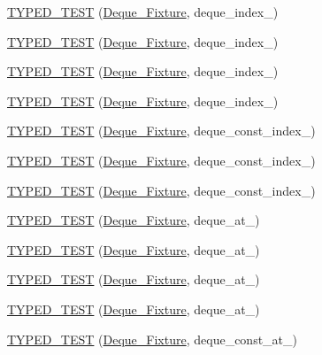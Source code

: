 \begin{DoxyCompactItemize}
\item 
\hyperlink{TestDeque_8c_09_09_a25f99a244d6b38026a8c7c3833c35976}{T\-Y\-P\-E\-D\-\_\-\-T\-E\-S\-T} (\hyperlink{structDeque__Fixture}{Deque\-\_\-\-Fixture}, deque\-\_\-index\-\_)
\item 
\hyperlink{TestDeque_8c_09_09_a37b19408f913732ec3441a3b4f3298c9}{T\-Y\-P\-E\-D\-\_\-\-T\-E\-S\-T} (\hyperlink{structDeque__Fixture}{Deque\-\_\-\-Fixture}, deque\-\_\-index\-\_)
\item 
\hyperlink{TestDeque_8c_09_09_a7a9cd30acbc9043ace80349348e8ff1e}{T\-Y\-P\-E\-D\-\_\-\-T\-E\-S\-T} (\hyperlink{structDeque__Fixture}{Deque\-\_\-\-Fixture}, deque\-\_\-index\-\_)
\item 
\hyperlink{TestDeque_8c_09_09_a9c533dd589fc834353048b53831c4b5d}{T\-Y\-P\-E\-D\-\_\-\-T\-E\-S\-T} (\hyperlink{structDeque__Fixture}{Deque\-\_\-\-Fixture}, deque\-\_\-index\-\_)
\item 
\hyperlink{TestDeque_8c_09_09_a9ac51be2c184c7125f8b3ab2807a4da7}{T\-Y\-P\-E\-D\-\_\-\-T\-E\-S\-T} (\hyperlink{structDeque__Fixture}{Deque\-\_\-\-Fixture}, deque\-\_\-const\-\_\-index\-\_)
\item 
\hyperlink{TestDeque_8c_09_09_a20578415bd1661d34e29d476369b3e99}{T\-Y\-P\-E\-D\-\_\-\-T\-E\-S\-T} (\hyperlink{structDeque__Fixture}{Deque\-\_\-\-Fixture}, deque\-\_\-const\-\_\-index\-\_)
\item 
\hyperlink{TestDeque_8c_09_09_a01bb6b9df0acd9ccc5949751c8da1039}{T\-Y\-P\-E\-D\-\_\-\-T\-E\-S\-T} (\hyperlink{structDeque__Fixture}{Deque\-\_\-\-Fixture}, deque\-\_\-const\-\_\-index\-\_)
\item 
\hyperlink{TestDeque_8c_09_09_aaf8840e96595941857961693b4c88729}{T\-Y\-P\-E\-D\-\_\-\-T\-E\-S\-T} (\hyperlink{structDeque__Fixture}{Deque\-\_\-\-Fixture}, deque\-\_\-at\-\_)
\item 
\hyperlink{TestDeque_8c_09_09_ad934b54be475d1d05054b6022d4fd889}{T\-Y\-P\-E\-D\-\_\-\-T\-E\-S\-T} (\hyperlink{structDeque__Fixture}{Deque\-\_\-\-Fixture}, deque\-\_\-at\-\_)
\item 
\hyperlink{TestDeque_8c_09_09_a4c0c731c6e5cc94d3840648199c9f417}{T\-Y\-P\-E\-D\-\_\-\-T\-E\-S\-T} (\hyperlink{structDeque__Fixture}{Deque\-\_\-\-Fixture}, deque\-\_\-at\-\_)
\item 
\hyperlink{TestDeque_8c_09_09_a8cef656e6c044c6560e73dc8556b956c}{T\-Y\-P\-E\-D\-\_\-\-T\-E\-S\-T} (\hyperlink{structDeque__Fixture}{Deque\-\_\-\-Fixture}, deque\-\_\-at\-\_)
\item 
\hyperlink{TestDeque_8c_09_09_a47dcbfbe8f8c3b25fced3ae8f574cd35}{T\-Y\-P\-E\-D\-\_\-\-T\-E\-S\-T} (\hyperlink{structDeque__Fixture}{Deque\-\_\-\-Fixture}, deque\-\_\-const\-\_\-at\-\_)

\end{DoxyCompactItemize}
